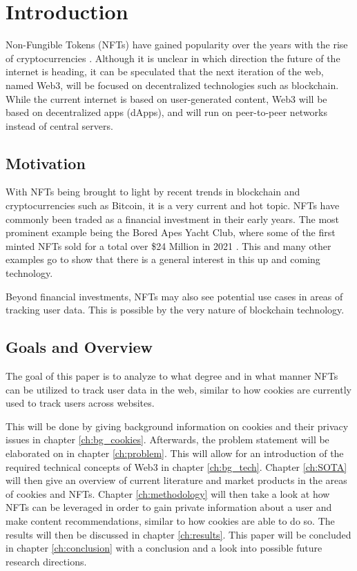 \chapter{Introduction}
\label{ch:intro}

Non-Fungible Tokens (NFTs) have gained popularity over the years with the rise of cryptocurrencies \cite{bayc}. Although it is unclear in which direction the future of the internet is heading, it can be speculated that the next iteration of the web, named Web3, will be focused on decentralized technologies such as blockchain. While the current internet is based on user-generated content, Web3 will be based on decentralized apps (dApps), and will run on peer-to-peer networks instead of central servers.

%
%
\section{Motivation}
\label{sec:intro:motivation}
With NFTs being brought to light by recent trends in blockchain and cryptocurrencies such as Bitcoin, it is a very current and hot topic. NFTs have commonly been traded as a financial investment in their early years. The most prominent example being the Bored Apes Yacht Club, where some of the first minted NFTs sold for a total over \$24 Million in 2021 \cite{bayc}. This and many other examples go to show that there is a general interest in this up and coming technology.

Beyond financial investments, NFTs may also see potential use cases in areas of tracking user data. This is possible by the very nature of blockchain technology.


%
%
\section{Goals and Overview}
\label{sec:intro:overview}
The goal of this paper is to analyze to what degree and in what manner NFTs can be utilized to track user data in the web, similar to how cookies are currently used to track users across websites.

This will be done by giving background information on cookies and their privacy issues in chapter \ref{ch:bg_cookies}. Afterwards, the problem statement will be elaborated on in chapter \ref{ch:problem}. This will allow for an introduction of the required technical concepts of Web3 in chapter \ref{ch:bg_tech}. Chapter \ref{ch:SOTA} will then give an overview of current literature and market products in the areas of cookies and NFTs. Chapter \ref{ch:methodology} will then take a look at how NFTs can be leveraged in order to gain private information about a user and make content recommendations, similar to how cookies are able to do so. The results will then be discussed in chapter \ref{ch:results}. This paper will be concluded in chapter \ref{ch:conclusion} with a conclusion and a look into possible future research directions.
